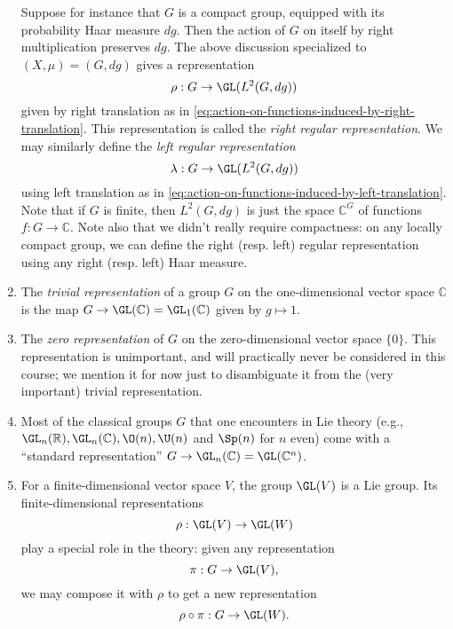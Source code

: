 \documentclass[reqno]{amsart} 
\begin{document}
\begin{example}
\begin{enumerate}
    Suppose for instance that $G$ is a compact group, equipped with its probability Haar measure $d g$.  Then the action of $G$ on itself by right multiplication preserves $d g$.  The above discussion specialized to $(X,\mu) = (G, d g)$ gives a representation
    \begin{equation*}
      \rho : G \rightarrow \GL(L^2(G,d g))
    \end{equation*}
    given by right translation as in \eqref{eq:action-on-functions-induced-by-right-translation}.  This representation is called the \emph{right regular representation}.  We may similarly define the \emph{left regular representation}
    \begin{equation*}
      \lambda : G \rightarrow \GL(L^2(G, d g))
    \end{equation*}
    using left translation as in \eqref{eq:action-on-functions-induced-by-left-translation}.  Note that if $G$ is finite, then $L^2(G, d g)$ is just the space $\mathbb{C}^G$ of functions $f : G \rightarrow \mathbb{C}$.  Note also that we didn't really require compactness: on any locally compact group, we can define the right (resp. left) regular representation using any right (resp. left) Haar measure.
  \item The \emph{trivial representation} of a group $G$ on the one-dimensional vector space $\mathbb{C}$ is the map $G \rightarrow \GL(\mathbb{C}) = \GL_1(\mathbb{C})$ given by $g \mapsto 1$.
  \item The \emph{zero representation} of $G$ on the zero-dimensional vector space $\{0\}$.  This representation is unimportant, and will practically never be considered in this course; we mention it for now just to disambiguate it from the (very important) trivial representation.
  \item Most of the classical groups $G$ that one encounters in Lie theory (e.g., $\GL_n(\mathbb{R}), \GL_n(\mathbb{C}), \O(n), \U(n)$ and $\Sp(n)$ for $n$ even) come with a ``standard representation'' $G \rightarrow \GL_n(\mathbb{C}) = \GL(\mathbb{C}^n)$.
  \item For a finite-dimensional vector space $V$, the group $\GL(V)$ is a Lie group.  Its finite-dimensional representations
    \begin{equation*}
      \rho : \GL(V) \rightarrow \GL(W)
    \end{equation*}
    play a special role in the theory: given any representation
    \begin{equation*}
\pi : G \rightarrow \GL(V),
\end{equation*}
    we may compose it with $\rho$ to get a new representation
    \begin{equation*}
\rho \circ \pi : G \rightarrow \GL(W).
\end{equation*}


\end{enumerate}
\end{example}
\end{document}
